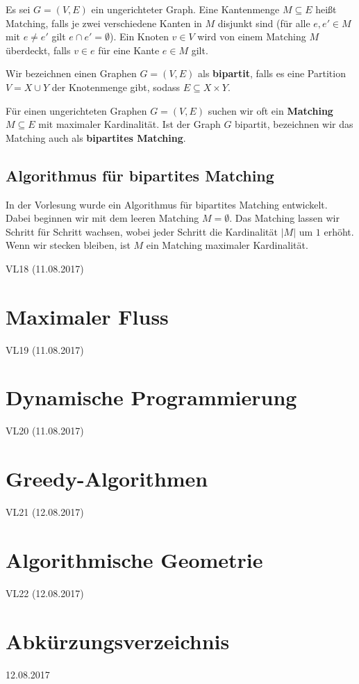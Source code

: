 \documentclass[12pt]{article}
\begin{document}
Es sei $G = (V, E)$ ein ungerichteter Graph. Eine Kantenmenge $M \subseteq E$ heißt Matching, falls je zwei verschiedene Kanten in $M$ disjunkt sind (für alle $e, e' \in M$ mit $e \neq e'$ gilt $e \cap e' = \emptyset$). Ein Knoten $v \in V$ wird von einem Matching $M$ überdeckt, falls $v \in e$ für eine Kante $e \in M$ gilt.

Wir bezeichnen einen Graphen $G = (V, E)$ als \textbf{bipartit}, falls es eine Partition $V = X \cup Y$ der Knotenmenge gibt, sodass $E \subseteq X \times Y$.

Für einen ungerichteten Graphen $G = (V, E)$ suchen wir oft ein \textbf{Matching} $M \subseteq E$ mit maximaler Kardinalität. Ist der Graph $G$ bipartit, bezeichnen wir das Matching auch als \textbf{bipartites Matching}.

\subsection{Algorithmus für bipartites Matching}

In der Vorlesung wurde ein Algorithmus für bipartites Matching entwickelt. Dabei beginnen wir mit dem leeren Matching $M = \emptyset$. Das Matching lassen wir Schritt für Schritt wachsen, wobei jeder Schritt die Kardinalität $|M|$ um $1$ erhöht. Wenn wir stecken bleiben, ist $M$ ein Matching maximaler Kardinalität.

VL18 (11.08.2017)

\section{Maximaler Fluss}

VL19 (11.08.2017)

\section{Dynamische Programmierung}

VL20 (11.08.2017)

\section{Greedy-Algorithmen}

VL21 (12.08.2017)

\section{Algorithmische Geometrie}

VL22 (12.08.2017)

\section{Abkürzungsverzeichnis}

12.08.2017
\end{document}

